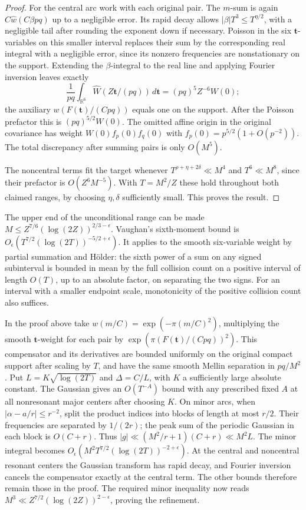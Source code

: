 \documentclass[11pt,letterpaper]{article}
\theoremstyle{definition}
\begin{document}
\begin{proof}
For the central arc work with each original pair. The $m$-sum is
again $C\widehat w(C\beta pq)$ up to a negligible error. Its
rapid decay allows $|\beta|T^3\le T^{\eta/2}$, with a negligible
tail after rounding the exponent down if necessary. Poisson in
the six $\mathbf t$-variables on this smaller interval replaces
their sum by the corresponding real integral with a negligible
error, since its nonzero frequencies are nonstationary on the
support. Extending the $\beta$-integral to the real line and
applying Fourier inversion leaves exactly
\[
 \frac1{pq}\int_{\mathbb R^6}\widehat W(Z\mathbf t/(pq))\,d\mathbf t
           = (pq)^5 Z^{-6}W(0);
\]
the auxiliary $w(F(\mathbf t)/(Cpq))$ equals one on the support.
After the Poisson prefactor this is $(pq)^{5/2}W(0)$. The omitted
affine origin in the original covariance has weight
$W(0)f_p(0)f_q(0)$ with $f_p(0)=p^{5/2}(1+O(p^{-2}))$.
The total discrepancy after summing pairs is only $O(M^5)$.

The noncentral terms fit the target whenever
$T^{\rho+\eta+2\delta}\ll M^4$ and $T^6\ll M^8$,
since their prefactor is $O(Z^6M^{-5})$. With
$T=M^2/Z$ these hold throughout both claimed ranges, by choosing
$\eta,\delta$ sufficiently small. This proves the result.
\end{proof}

The upper end of the unconditional range can be made
$M\le Z^{7/6}(\log(2Z))^{2/3-\epsilon}$.
Vaughan's sixth-moment bound
\cite[Theorem~1.2]{c3:vaughan-trescubi} is
$O_\epsilon(T^{7/2}(\log(2T))^{-5/2+\epsilon})$.
It applies to the smooth six-variable weight by partial summation
and H\"older: the sixth power of a sum on any signed subinterval
is bounded in mean by the full collision count on a positive
interval of length $O(T)$, up to an absolute factor, on separating
the two signs. For an interval with a smaller endpoint scale,
monotonicity of the positive collision count also suffices.

In the proof above take $w(m/C)=\exp(-\pi (m/C)^2)$,
multiplying the smooth $\mathbf t$-weight for each pair by
$\exp(\pi(F(\mathbf t)/(Cpq))^2)$. This compensator and its
derivatives are bounded uniformly on the original compact
support after scaling by $T$, and have the same smooth Mellin
separation in $pq/M^2$. Put $L=K\sqrt{\log(2T)}$ and
$\Delta=C/L$, with $K$ a sufficiently large absolute constant.
The Gaussian gives an $O(T^{-A})$ bound with any prescribed fixed
$A$ at all nonresonant major centers after choosing $K$.
On minor arcs, when $|\alpha-a/r|\le r^{-2}$, split the product
indices into blocks of length at most $r/2$. Their frequencies
are separated by $1/(2r)$; the peak sum of the periodic
Gaussian in each block is $O(C+r)$. Thus
$|g|\ll (M^2/r+1)(C+r)\ll M^2 L$.
The minor integral becomes
$O_\epsilon(M^2T^{7/2}(\log(2T))^{-2+\epsilon})$.
At the central and noncentral resonant centers the Gaussian
transform has rapid decay, and Fourier inversion cancels the
compensator exactly at the central term. The other bounds
therefore remain those in the proof. The required minor
inequality now reads
$M^3\ll Z^{7/2}(\log(2Z))^{2-\epsilon}$, proving the refinement.
\end{document}
